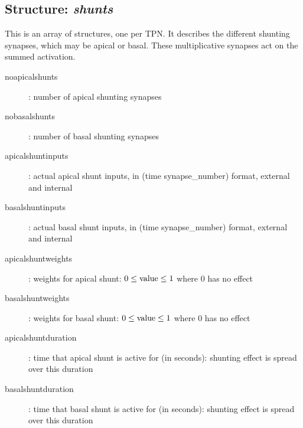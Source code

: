 \documentclass[11pt, oneside]{article}   	%
\begin{document}
\subsection{Structure: {\it shunts}}
This is an array of structures, one per TPN. It describes the different shunting synapses, which may be apical or basal. These multiplicative synapses act on the summed activation.
\begin{description}
\item[noapicalshunts]: number of apical shunting synapses
\item[nobasalshunts]: number of basal shunting synapses
\item[apicalshuntinputs]: actual apical shunt inputs, in (time synapse\_number) format, external and internal
\item[basalshuntinputs]: actual basal shunt inputs, in (time synapse\_number) format, external and internal
\item[apicalshuntweights]: weights for apical shunt: $0 \leq {\rm value} \leq 1$ where $0$ has no effect
\item[basalshuntweights]: weights for basal shunt: $0 \leq {\rm value} \leq 1$ where $0$ has no effect
\item[apicalshuntduration]: time that apical shunt is active for (in seconds): shunting effect is spread over this duration
\item[basalshuntduration]: time that basal shunt is active for (in seconds): shunting effect is spread over this duration
\end{description}
\end{document}
